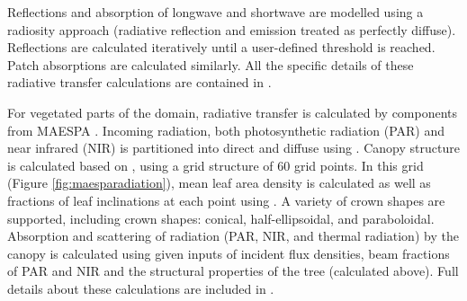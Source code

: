 \documentclass[preprint,12pt,authoryear]{elsarticle}
\begin{document}
Reflections and absorption of longwave and shortwave are modelled using a radiosity approach (radiative reflection and emission treated as perfectly diffuse). Reflections are calculated iteratively until a user-defined threshold is reached. Patch absorptions are calculated similarly. All the specific details of these radiative transfer calculations are contained in \cite{Krayenhoff2007}.

%
%

For vegetated parts of the domain, radiative transfer is calculated by components from MAESPA \citep{Duursma2012}. Incoming radiation, both photosynthetic radiation (PAR) and near infrared (NIR) is partitioned into direct and diffuse using \cite{Weiss1985}. Canopy structure is calculated based on \cite{Wang1990}, using a grid structure of 60 grid points. In this grid (Figure \ref{fig:maesparadiation}), mean leaf area density is calculated as well as fractions of leaf inclinations at each point using \cite{Wang1990a}. A variety of crown shapes are supported, including crown shapes: conical, half-ellipsoidal, and paraboloidal. Absorption and scattering of radiation (PAR, NIR, and thermal radiation) by the canopy is calculated using \cite{Norman1979} given inputs of incident flux densities, beam fractions of PAR and NIR and the structural properties of the tree (calculated above). Full details about these calculations are included in \cite{Duursma2012}.
\end{document}
